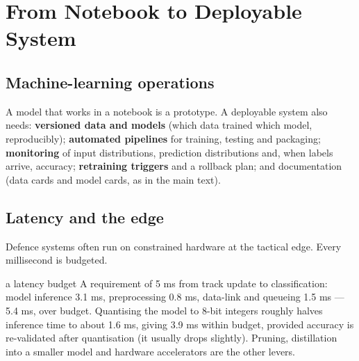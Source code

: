 \documentclass[11pt]{article}
\begin{document}
\section{From Notebook to Deployable System}
\subsection{Machine-learning operations}
A model that works in a notebook is a prototype. A deployable system also needs: \textbf{versioned data and models} (which data trained which model, reproducibly); \textbf{automated pipelines} for training, testing and packaging; \textbf{monitoring} of input distributions, prediction distributions and, when labels arrive, accuracy; \textbf{retraining triggers} and a rollback plan; and documentation (data cards and model cards, as in the main text).
\subsection{Latency and the edge}
Defence systems often run on constrained hardware at the tactical edge. Every millisecond is budgeted.
\begin{example}{a latency budget}
A requirement of 5 ms from track update to classification: model inference 3.1 ms, preprocessing 0.8 ms, data-link and queueing 1.5 ms --- 5.4 ms, over budget. Quantising the model to 8-bit integers roughly halves inference time to about 1.6 ms, giving 3.9 ms within budget, provided accuracy is re-validated after quantisation (it usually drops slightly). Pruning, distillation into a smaller model and hardware accelerators are the other levers.
\end{example}
\end{document}
